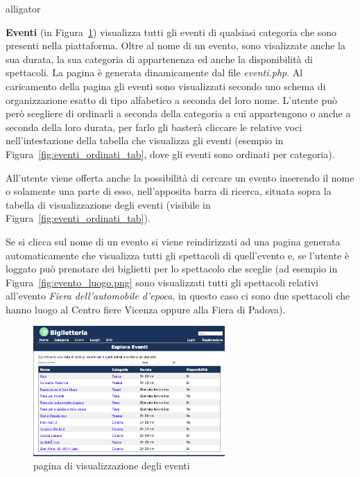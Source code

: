\documentclass[10pt, a4paper]{article}
\begin{document}
\begin{labeling}{alligator}
\item[\textbf{\textcolor{UniPD}{Eventi}}] (in Figura~\ref{fig:eventi})
visualizza tutti gli eventi di qualsiasi
categoria che sono presenti nella piattaforma. 
Oltre al nome di un evento, sono visalizzate anche la sua durata, 
la sua categoria di appartenenza ed anche la disponibilità di spettacoli.
La pagina è generata dinamicamente dal file \emph{eventi.php}.
Al caricamento della pagina gli eventi sono visualizzati secondo
uno schema di organizzazione esatto di tipo alfabetico a seconda
del loro nome. L'utente può però scegliere di ordinarli a seconda
della categoria a cui appartengono o anche a seconda della loro
durata, per farlo gli basterà cliccare le relative voci 
nell'intestazione della tabella che visualizza gli eventi
(esempio in Figura~\ref{fig:eventi_ordinati_tab}, dove
gli eventi sono ordinati per categoria).

All'utente viene offerta anche la possibilità di cercare un evento
inserendo il nome o solamente una parte di esso, nell'apposita
barra di ricerca, situata sopra la tabella di visualizzazione degli
eventi (visibile in Figura~\ref{fig:eventi_ordinati_tab}).

Se si clicca sul nome di un evento si viene reindirizzati ad una pagina
generata automaticamente che visualizza tutti gli spettacoli
di quell'evento e, se l'utente è loggato può prenotare dei biglietti
per lo spettacolo che sceglie (ad esempio in Figura~\ref{fig:evento_luogo.png}
sono visualizzati tutti gli spettacoli relativi all'evento \emph{Fiera dell'automobile d'epoca},
in questo caso ci sono due spettacoli che hanno luogo al Centro fiere Vicenza oppure alla Fiera di Padova).


\begin{figure}[h!]
  \centering
  \includegraphics[width=0.65\textwidth]{Images/eventi.png}
  \caption{pagina di visualizzazione degli eventi}
  \label{fig:eventi}
\end{figure}


\end{labeling}
\end{document}
